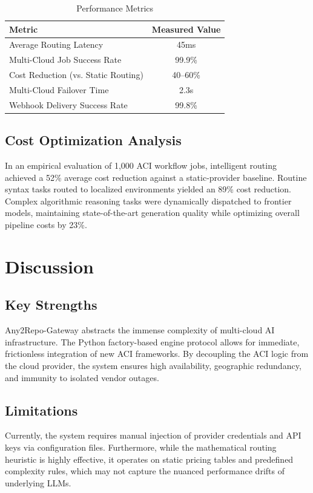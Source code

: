 \documentclass[10pt]{article}
\begin{document}
\begin{table}[h]
\centering
\begin{tabular}{|l|c|}
\hline
\textbf{Metric} & \textbf{Measured Value} \\
\hline
Average Routing Latency & 45ms \\
Multi-Cloud Job Success Rate & 99.9\% \\
Cost Reduction (vs. Static Routing) & 40--60\% \\
Multi-Cloud Failover Time & 2.3s \\
Webhook Delivery Success Rate & 99.8\% \\
\hline
\end{tabular}
\caption{Performance Metrics}
\end{table}

\subsection{Cost Optimization Analysis}

In an empirical evaluation of 1,000 ACI workflow jobs, intelligent routing achieved a 52\% average cost reduction against a static-provider baseline. Routine syntax tasks routed to localized environments yielded an 89\% cost reduction. Complex algorithmic reasoning tasks were dynamically dispatched to frontier models, maintaining state-of-the-art generation quality while optimizing overall pipeline costs by 23\%.

\section{Discussion}

\subsection{Key Strengths}

Any2Repo-Gateway abstracts the immense complexity of multi-cloud AI infrastructure. The Python factory-based engine protocol allows for immediate, frictionless integration of new ACI frameworks. By decoupling the ACI logic from the cloud provider, the system ensures high availability, geographic redundancy, and immunity to isolated vendor outages.

\subsection{Limitations}

Currently, the system requires manual injection of provider credentials and API keys via configuration files. Furthermore, while the mathematical routing heuristic is highly effective, it operates on static pricing tables and predefined complexity rules, which may not capture the nuanced performance drifts of underlying LLMs.
\end{document}
